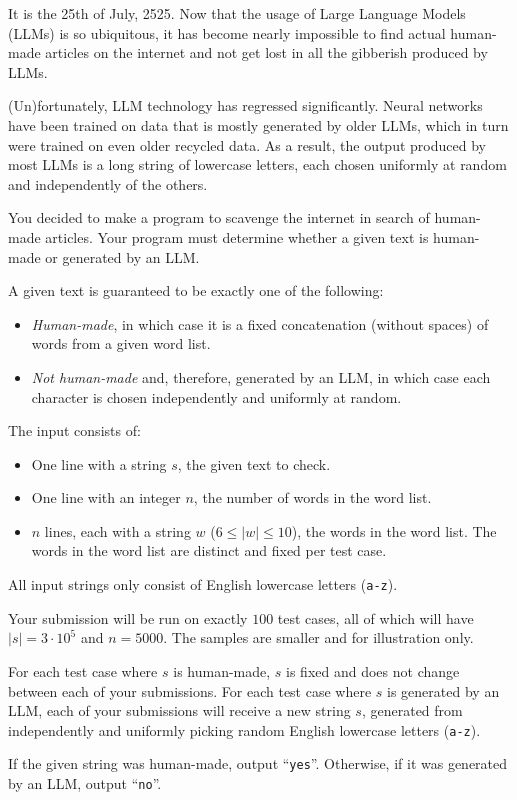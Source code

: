 

\newcommand{\maxlen}{3\cdot10^5}
\newcommand{\maxwords}{5000}
\newcommand{\minwordlen}{6}
\newcommand{\maxwordlen}{10}
\newcommand{\maxtests}{100}

It is the 25th of July, 2525.
Now that the usage of Large Language Models (LLMs) is so ubiquitous,
it has become nearly impossible to find actual human-made articles on the internet and not get lost in all the gibberish produced by LLMs.

(Un)fortunately, LLM technology has regressed significantly.
Neural networks have been trained on data that is mostly generated by older LLMs, which in turn were trained on even older recycled data.
As a result, the output produced by most LLMs is a long string of lowercase letters, each chosen uniformly at random and independently of the others.

You decided to make a program to scavenge the internet in search of human-made articles.
Your program must determine whether a given text is human-made or generated by an LLM.

A given text is guaranteed to be exactly one of the following:
\begin{itemize}
    \item \emph{Human-made}, in which case it is a fixed concatenation (without spaces) of words from a given word list.
    \item \emph{Not human-made} and, therefore, generated by an LLM, in which case each character is chosen independently and uniformly at random.
\end{itemize}

\begin{Input}
    The input consists of:
    \begin{itemize}
        \item One line with a string $s$, the given text to check.
        \item One line with an integer $n$, the number of words in the word list.
        \item $n$ lines, each with a string $w$ ($\minwordlen \leq |w| \leq \maxwordlen$), the words in the word list.
            The words in the word list are distinct and fixed per test case.
    \end{itemize}
    All input strings only consist of English lowercase letters (\texttt{a-z}).

    Your submission will be run on exactly $100$ test cases, all of which will have $|s| = \maxlen$ and $n = \maxwords$.
    The samples are smaller and for illustration only.

    For each test case where $s$ is human-made, $s$ is fixed and does not change between each of your submissions.
    For each test case where $s$ is generated by an LLM,
    each of your submissions will receive a new string $s$,
    generated from independently and uniformly picking random English lowercase letters (\texttt{a-z}).
\end{Input}

\begin{Output}
    If the given string was human-made, output ``\texttt{yes}''.
    Otherwise, if it was generated by an LLM, output ``\texttt{no}''.
\end{Output}
